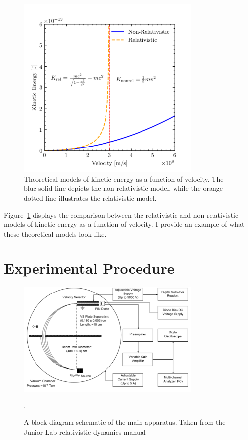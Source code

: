 \documentclass[aps,twocolumn,secnumarabic,balancelastpage,amsmath,amssymb,nofootinbib, floatfix]{revtex4-2}
\begin{document}
	\begin{figure}
		\includegraphics[width=9cm]{theoretical_ke_models.png}
		\caption{Theoretical models of kinetic energy as a function of velocity. The blue solid line depicts the non-relativistic model, while the orange dotted line illustrates the relativistic model.}
		\label{fig:model}
	\end{figure}
	
	Figure~\ref{fig:model} displays the comparison between the relativistic and non-relativistic models of kinetic energy as a function of velocity. I provide an example of what these theoretical models look like. 
	
	
	
	\section{Experimental Procedure}
	
	\begin{figure}[H]
		\includegraphics[width=9cm]{setup_block_diagram.png}
		\caption{A block diagram schematic of the main apparatus. Taken from the Junior Lab relativistic dynamics manual \cite{labmanual}}.
		\label{fig:apparat}
	\end{figure}
	
\end{document}
